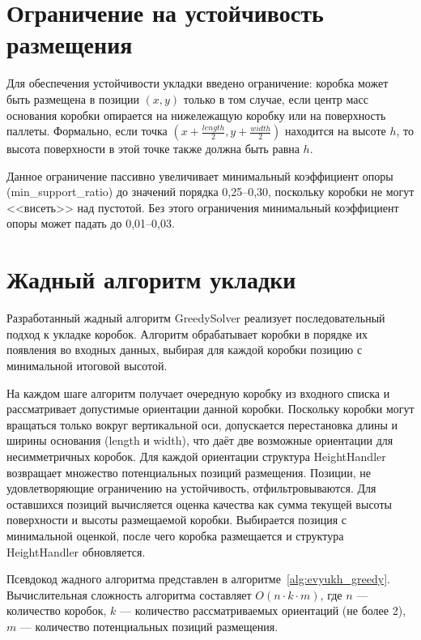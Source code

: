 \section{Ограничение на устойчивость размещения}
\label{sec:stability_constraint}

Для обеспечения устойчивости укладки введено ограничение: коробка может быть размещена в позиции $(x, y)$ только в том случае, если центр масс основания коробки опирается на нижележащую коробку или на поверхность паллеты. Формально, если точка $(x + \frac{length}{2}, y + \frac{width}{2})$ находится на высоте $h$, то высота поверхности в этой точке также должна быть равна $h$.

Данное ограничение пассивно увеличивает минимальный коэффициент опоры (min\_support\_ratio) до значений порядка 0,25--0,30, поскольку коробки не могут <<висеть>> над пустотой. Без этого ограничения минимальный коэффициент опоры может падать до 0,01--0,03.

\section{Жадный алгоритм укладки}

Разработанный жадный алгоритм GreedySolver реализует последовательный подход к укладке коробок. Алгоритм обрабатывает коробки в порядке их появления во входных данных, выбирая для каждой коробки позицию с минимальной итоговой высотой.

На каждом шаге алгоритм получает очередную коробку из входного списка и рассматривает допустимые ориентации данной коробки. Поскольку коробки могут вращаться только вокруг вертикальной оси, допускается перестановка длины и ширины основания (length и width), что даёт две возможные ориентации для несимметричных коробок. Для каждой ориентации структура HeightHandler возвращает множество потенциальных позиций размещения. Позиции, не удовлетворяющие ограничению на устойчивость, отфильтровываются. Для оставшихся позиций вычисляется оценка качества как сумма текущей высоты поверхности и высоты размещаемой коробки. Выбирается позиция с минимальной оценкой, после чего коробка размещается и структура HeightHandler обновляется.

Псевдокод жадного алгоритма представлен в алгоритме~\ref{alg:evyukh_greedy}. Вычислительная сложность алгоритма составляет $O(n \cdot k \cdot m)$, где $n$ --- количество коробок, $k$ --- количество рассматриваемых ориентаций (не более 2), $m$ --- количество потенциальных позиций размещения.

